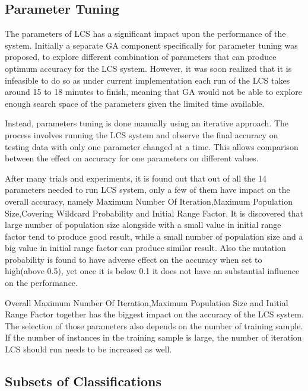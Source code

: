 \documentclass[11pt]{article}
\begin{document}
\subsection{Parameter Tuning}
\label{sec:paramTune}

The parameters of LCS has a significant impact upon the performance of the system. Initially a separate GA component specifically for parameter tuning was proposed, to explore different combination of parameters that can produce optimum accuracy for the LCS system. However, it was soon realized that it is infeasible to do so as under current implementation each run of the LCS takes around 15 to 18 minutes to finish, meaning that GA would not be able to explore enough search space of the parameters given the limited time available.

Instead, parameters tuning is done manually using an iterative approach. The process involves running the LCS system and observe the final accuracy on testing data with only one parameter changed at a time. This allows comparison between the effect on accuracy for one parameters on different values. 

After many trials and experiments, it is found out that out of all the 14 parameters needed to run LCS system, only a few of them have impact on the overall accuracy, namely Maximum Number Of Iteration,Maximum Population Size,Covering Wildcard Probability and Initial Range Factor. It is discovered that large number of population size alongside with a small value in initial range factor tend to produce good result, while a small number of population size and a big value in initial range factor can produce similar result. Also the mutation probability is found to have adverse effect on the accuracy when set to high(above 0.5), yet once it is below 0.1 it does not have an substantial influence on the performance.  

Overall Maximum Number Of Iteration,Maximum Population Size and Initial Range Factor together has the biggest impact on the accuracy of the LCS system. The selection of those parameters also depends on the number of training sample. If the number of instances in the training sample is large, the number of iteration LCS should run needs to be increased as well.



\subsection{Subsets of Classifications}
\label{sec:subsets}
\end{document}
